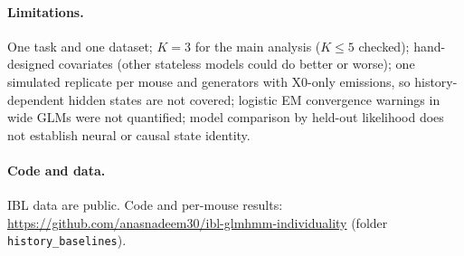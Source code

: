 \documentclass[11pt]{article}
\begin{document}
\paragraph{Limitations.} One task and one dataset; $K=3$ for the main analysis ($K\le5$ checked); hand-designed covariates (other stateless models could do better or worse); one simulated replicate per mouse and generators with X0-only emissions, so history-dependent hidden states are not covered; logistic EM convergence warnings in wide GLMs were not quantified; model comparison by held-out likelihood does not establish neural or causal state identity.

\paragraph{Code and data.} IBL data are public. Code and per-mouse results: \url{https://github.com/anasnadeem30/ibl-glmhmm-individuality} (folder \texttt{history\_baselines}).
\end{document}
